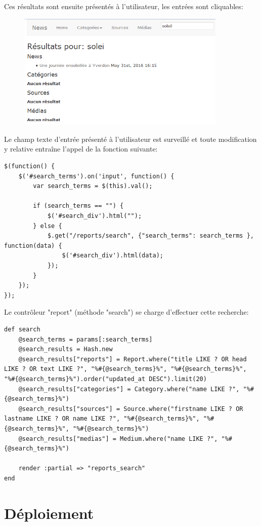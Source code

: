\documentclass{article}
\begin{document}
Ces résultats sont ensuite présentés à l'utilisateur, les entrées sont cliquables:

\begin{figure}[h]
  \centering
  \includegraphics[width=10cm]{recherche_ajax}
\end{figure}

Le champ texte d'entrée présenté à l'utilisateur est surveillé et toute modification y relative entraîne l'appel de la fonction suivante:

\begin{lstlisting}
$(function() {
	$('#search_terms').on('input', function() {
		var search_terms = $(this).val();
		
		if (search_terms == "") {
			$('#search_div').html("");
		} else {
			$.get("/reports/search", {"search_terms": search_terms }, function(data) {
				$('#search_div').html(data);
			});
		}
	});
});
\end{lstlisting}

Le contrôleur "report" (méthode "search") se charge d'effectuer cette recherche:

\begin{lstlisting}
def search
	@search_terms = params[:search_terms]
	@search_results = Hash.new
	@search_results["reports"] = Report.where("title LIKE ? OR head LIKE ? OR text LIKE ?", "%#{@search_terms}%", "%#{@search_terms}%", "%#{@search_terms}%").order("updated_at DESC").limit(20)
	@search_results["categories"] = Category.where("name LIKE ?", "%#{@search_terms}%")
	@search_results["sources"] = Source.where("firstname LIKE ? OR lastname LIKE ? OR name LIKE ?", "%#{@search_terms}%", "%#{@search_terms}%", "%#{@search_terms}%")
	@search_results["medias"] = Medium.where("name LIKE ?", "%#{@search_terms}%")
	
	render :partial => "reports_search"
end
\end{lstlisting}

\section{Déploiement}
\end{document}
